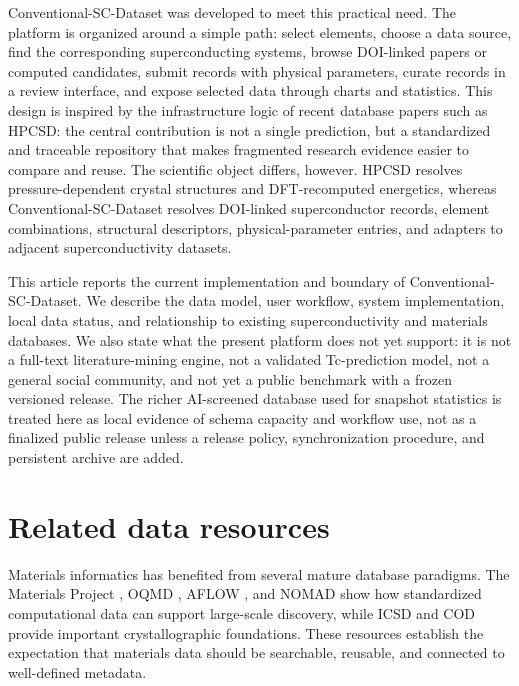 \documentclass[11pt,a4paper]{article}
\begin{document}
Conventional-SC-Dataset was developed to meet this practical need. The platform is organized around a simple path: select elements, choose a data source, find the corresponding superconducting systems, browse DOI-linked papers or computed candidates, submit records with physical parameters, curate records in a review interface, and expose selected data through charts and statistics. This design is inspired by the infrastructure logic of recent database papers such as HPCSD: the central contribution is not a single prediction, but a standardized and traceable repository that makes fragmented research evidence easier to compare and reuse. The scientific object differs, however. HPCSD resolves pressure-dependent crystal structures and DFT-recomputed energetics, whereas Conventional-SC-Dataset resolves DOI-linked superconductor records, element combinations, structural descriptors, physical-parameter entries, and adapters to adjacent superconductivity datasets.

This article reports the current implementation and boundary of Conventional-SC-Dataset. We describe the data model, user workflow, system implementation, local data status, and relationship to existing superconductivity and materials databases. We also state what the present platform does not yet support: it is not a full-text literature-mining engine, not a validated Tc-prediction model, not a general social community, and not yet a public benchmark with a frozen versioned release. The richer AI-screened database used for snapshot statistics is treated here as local evidence of schema capacity and workflow use, not as a finalized public release unless a release policy, synchronization procedure, and persistent archive are added.

\section{Related data resources}

Materials informatics has benefited from several mature database paradigms. The Materials Project \cite{jain2013materialsproject}, OQMD \cite{kirklin2015oqmd}, AFLOW \cite{curtarolo2015aflow}, and NOMAD \cite{draxl2018nomad} show how standardized computational data can support large-scale discovery, while ICSD \cite{belsky2002icsd} and COD \cite{grazulis2012cod} provide important crystallographic foundations. These resources establish the expectation that materials data should be searchable, reusable, and connected to well-defined metadata.
\end{document}

